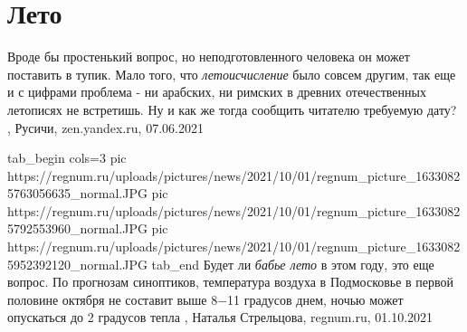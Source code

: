  
 
 
 
 
\chapter{Лето}
\label{sec:slova.leto}

Вроде бы простенький вопрос, но неподготовленного человека он может поставить в
тупик. Мало того, что \emph{летоисчисление} было совсем другим, так еще и с цифрами
проблема - ни арабских, ни римских в древних отечественных летописях не
встретишь. Ну и как же тогда сообщить читателю требуемую дату?
, 
Русичи, zen.yandex.ru, 07.06.2021

\ifcmt
  tab_begin cols=3
     pic https://regnum.ru/uploads/pictures/news/2021/10/01/regnum_picture_16330825763056635_normal.JPG
     pic https://regnum.ru/uploads/pictures/news/2021/10/01/regnum_picture_16330825792553960_normal.JPG
		 pic https://regnum.ru/uploads/pictures/news/2021/10/01/regnum_picture_16330825952392120_normal.JPG
  tab_end
\fi
Будет ли \emph{бабье лето} в этом году, это еще вопрос. По прогнозам синоптиков,
температура воздуха в Подмосковье в первой половине октября не составит выше
8−11 градусов днем, ночью может опускаться до 2 градусов тепла
, 
Наталья Стрельцова, regnum.ru, 01.10.2021


